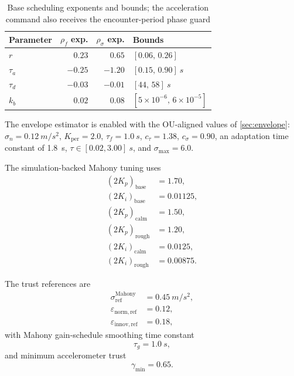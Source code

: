 \documentclass[conference]{IEEEtran}
\begin{document}
    \begin{table}[t]
        \centering
        \caption{Base scheduling exponents and bounds; the acceleration command also receives the encounter-period phase guard}
        \label{tab:exponents}
        \small
        \begin{tabular}{@{}lrrl@{}}
            \toprule
            Parameter & \(\rho_f\) exp. & \(\rho_\sigma\) exp. & Bounds \\
            \midrule
            \(r\)       & \(0.23\)  & \(0.65\)  & \([0.06,\,0.26]\) \\
            \(\tau_a\)  & \(-0.25\) & \(-1.20\) & \([0.15,\,0.90]~\si{s}\) \\
            \(\tau_d\)  & \(-0.03\) & \(-0.01\) & \([44,\,58]~\si{s}\) \\
            \(k_b\)     & \(0.02\)  & \(0.08\)  & \([5\times10^{-6},\,6\times10^{-5}]\) \\
            \bottomrule
        \end{tabular}
    \end{table}

    The envelope estimator is enabled with the OU-aligned values of
    \cref{sec:envelope}: \(\sigma_n=\SI{0.12}{m/s^2}\), \(K_{\mathrm{per}}=2.0\),
    \(\tau_f=\SI{1.0}{s}\), \(c_\tau=1.38\), \(c_\sigma=0.90\), an adaptation
    time constant of \SI{1.8}{s}, \(\tau\in[0.02,3.00]~\si{s}\), and
    \(\sigma_{\max}=6.0\).

    The simulation-backed Mahony tuning uses
    \begin{align}
    (2K_p)_{\mathrm{base}} &= 1.70,\\
    (2K_i)_{\mathrm{base}} &= 0.01125,\\
    (2K_p)_{\mathrm{calm}} &= 1.50,\\
    (2K_p)_{\mathrm{rough}} &= 1.20,\\
    (2K_i)_{\mathrm{calm}} &= 0.0125,\\
    (2K_i)_{\mathrm{rough}} &= 0.00875.
    \end{align}

    The trust references are
    \begin{align}
        \sigma_{\mathrm{ref}}^{\mathrm{Mahony}} &= 0.45~\si{m/s^2},\\
        \varepsilon_{\mathrm{norm,ref}} &= 0.12,\\
        \varepsilon_{\mathrm{innov,ref}} &= 0.18,
    \end{align}
    with Mahony gain-schedule smoothing time constant
    \begin{equation}
        \tau_g = 1.0~\si{s},
    \end{equation}
    and minimum accelerometer trust
    \begin{equation}
        \gamma_{\min} = 0.65.
    \end{equation}
\end{document}
